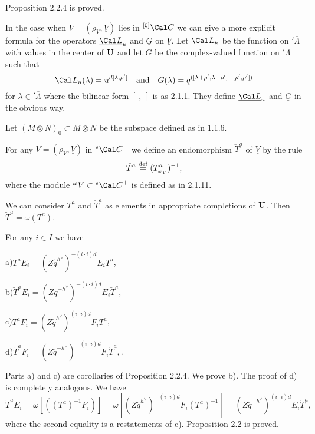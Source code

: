 Proposition 2.2.4 is proved.

\medpagebreak

  In the case when $V = (\rho_V, \underline{V})$ lies in
${}^{[0]}{\Cal C}$  we can give a more explicit formula for the operators
$\underline{\Cal L}_u$  and  $\underline{G}$  on $\underline{V}$.  Let
${\Cal L}_u$  be the function on $'\overline{\Lambda}$  with values in the
center of ${\bold U}$ and let $G$  be the complex-valued function on
$'\overline{\Lambda}$
such that
$$
{\Cal L}_u(\lambda) = u^{d[\lambda,\rho']}\quad
\text{and}\quad G(\lambda) = q^{([\lambda +\rho',
\lambda + \rho'] - [\rho',\rho'])}
$$
for $\lambda \in {}'\overline{\Lambda}$  where the bilinear form
$[\ ,\ ]$  is as 2.1.1.  They define $\underline{\Cal L}_u$  and
$\underline{G}$  in the obvious way.

Let $(\underline{M} \otimes \underline{N})_0 \subset \underline{M} \otimes
\underline{N}$  be the subspace defined as in 1.1.6.

\medpagebreak

  For any  $V = (\rho_V, \underline{V})$  in
${}^s{\Cal C}^-$  we define an endomorphism  $\check{T}^a$  of
$\underline{V}$   by the rule
$$
\check{T}^a\ {\buildrel {\text{def}}\over =}\ (T_{{}_{{}^\omega V}}^a)^{-1},
$$
where the module  ${}^\omega V \subset {}^s{\Cal C}^+$  is defined as in
2.1.11.

  We can consider  $T^a$  and  $\check{T}^a$  as elements in
appropriate completions of ${\bold U}$.  Then $\check{T}^a = \omega(T^a)$.
\enddemo

  For any  $i \in I$  we have

\noindent
a)\quad  $T^a E_i = (Z\widetilde{q}^{h^\vee})^{-(i\cdot i)d} E_i T^a$,

\noindent
b)\quad  $\check{T}^a E_i = (Z\widetilde{q}^{-h^\vee})^{-(i\cdot i)d}
E_i \check{T}^a,$

\noindent
c)\quad  $T^a F_i = (Z\widetilde{q}^{h^\vee})^{(i\cdot i)d} F_i T^a$,

\noindent
d)\quad  $\check{T}^a F_i = (Z\widetilde{q}^{-h^\vee})^{-(i\cdot i)d} F_i
\check{T}^a,$.
\endproclaim

  Parts a) and c) are corollaries of Proposition 2.2.4.  We prove
b).  The proof of d) is completely analogous.  We have
$$
\check{T}^aE_i = \omega[((T^a)^{-1}F_i)] =
\omega[(Z\widetilde{q}^{h^\vee})^{-(i\cdot i)d} F_i(T^a)^{-1}] =
(Z\widetilde{q}^{-h^\vee})^{(i\cdot i)d} E_i \check{T}^a,
$$
where the second equality is a restatements of c).   Proposition 2.2 is proved.
\enddemo

